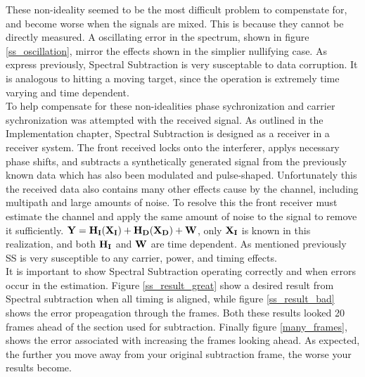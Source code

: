 These non-ideality seemed to be the most difficult problem to compenstate for, and become worse when the signals are mixed.  This is because they cannot be directly measured.  A oscillating error in the spectrum, shown in figure \ref{ss_oscillation}, mirror the effects shown in the simplier nullifying case.  As express previously, Spectral Subtraction is very susceptable to data corruption.  It is analogous to hitting a moving target, since the operation is extremely time varying and time dependent.\\  

To help compensate for these non-idealities phase sychronization and carrier sychronization was attempted with the received signal.  As outlined in the Implementation chapter, Spectral Subtraction is designed as a receiver in a receiver system.  The front received locks onto the interferer, applys necessary phase shifts, and subtracts a synthetically generated signal from the previously known data which has also been modulated and pulse-shaped.  Unfortunately this the received data also contains many other effects cause by the channel, including multipath and large amounts of noise.  To resolve this the front receiver must estimate the channel and apply the same amount of noise to the signal to remove it sufficiently.  \( \bf{Y}=H_{I}(X_{I})+H_{D}(X_{D})+W \), only \(\bf{X_{I}}\) is known in this realization, and both \(\bf{H_{I}}\) and \(\bf{W}\) are time dependent.  As mentioned previously SS is very susceptible to any carrier, power, and timing effects.\\


It is important to show Spectral Subtraction operating correctly and when errors occur in the estimation.  Figure \ref{ss_result_great} show a desired result from Spectral subtraction when all timing is aligned, while figure \ref{ss_result_bad} shows the error propeagation through the frames.  Both these results looked 20 frames ahead of the section used for subtraction.  Finally figure \ref{many_frames}, shows the error associated with increasing the frames looking ahead.  As expected, the further you move away from your original subtraction frame, the worse your results become.\\

